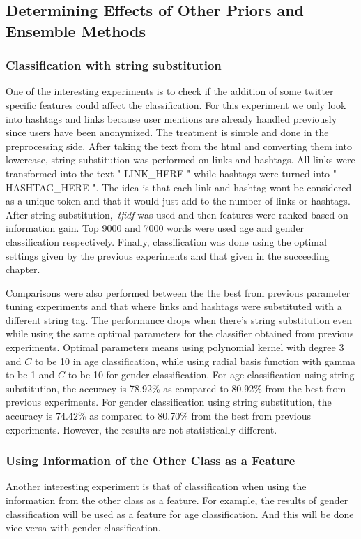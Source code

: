 \documentclass[a4paper]{llncs}
\begin{document}
\subsection{Determining Effects of Other Priors and Ensemble Methods}

\subsubsection{Classification with string substitution}
One of the interesting experiments is to check if the addition of some twitter specific features could affect the classification. For this experiment we only look into hashtags and links because user mentions are already handled previously since users have been anonymized. The treatment is simple and done in the preprocessing side. After taking the text from the html and converting them into lowercase, string substitution was performed on links and hashtags. All links were transformed into the text " LINK\_HERE " while hashtags were turned into " HASHTAG\_HERE ". The idea is that each link and hashtag wont be considered as a unique token and that it would just add to the number of links or hashtags. After string substitution,~\textit{tfidf} was used and then features were ranked based on information gain. Top 9000 and 7000 words were used age and gender classification respectively. Finally, classification was done using the optimal settings given by the previous experiments and that given in the succeeding chapter. 

Comparisons were also performed between the the best from previous parameter tuning experiments and that where links and hashtags were substituted with a different string tag. The performance drops when there's string substitution even while using the same optimal parameters for the classifier obtained from previous experiments. Optimal parameters means using polynomial kernel with degree 3 and $C$ to be 10 in age classification, while using radial basis function with gamma to be 1 and $C$ to be 10 for gender classification. For age classification using string substitution, the accuracy is 78.92\% as compared to 80.92\% from the best from previous experiments. For gender classification using string substitution, the accuracy is 74.42\% as compared to 80.70\% from the best from previous experiments. However, the results are not statistically different.



\subsubsection{Using Information of the Other Class as a Feature}
Another interesting experiment is that of classification when using the information from the other class as a feature. For example, the results of gender classification will be used as a feature for age classification. And this will be done vice-versa with gender classification.  
\end{document}
